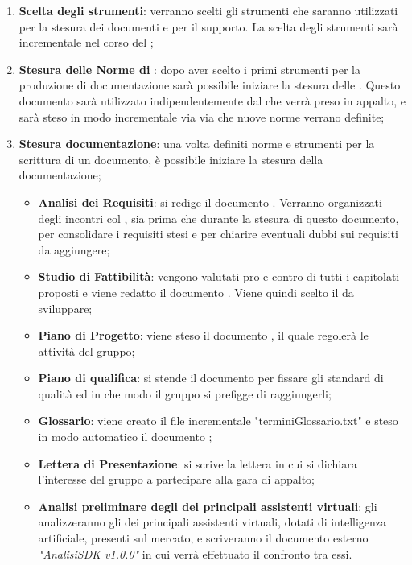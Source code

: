 \documentclass[./PianoDiProgetto.tex]{subfiles}
\begin{document}
  \begin{enumerate}
		\item \textbf{Scelta degli strumenti}: verranno scelti gli strumenti che saranno utilizzati per la stesura dei documenti e per il supporto. La scelta degli strumenti sarà incrementale nel corso del ;
		\item \textbf{Stesura delle Norme di }: dopo aver scelto i primi strumenti per la produzione di documentazione sarà possibile iniziare la stesura delle \NPdocRR. Questo documento sarà utilizzato indipendentemente dal  che verrà preso in appalto, e sarà steso in modo incrementale via via che nuove norme verrano definite;
		\item \textbf{Stesura documentazione}: una volta definiti norme e strumenti per la scrittura di un documento, è possibile iniziare la stesura della documentazione;
    \begin{itemize}
      \item \textbf{Analisi dei Requisiti}: si redige il documento \ARdocRR. Verranno organizzati degli incontri col , sia prima che durante la stesura di questo documento, per consolidare i requisiti stesi e per chiarire eventuali dubbi sui requisiti da aggiungere;
      \item \textbf{Studio di Fattibilità}: vengono valutati pro e contro di tutti i capitolati proposti e viene redatto il documento \SFdocRR. Viene quindi scelto il  da sviluppare;
      \item \textbf{Piano di Progetto}: viene steso il documento \PPdocRR, il quale regolerà le attività del gruppo;
      \item \textbf{Piano di qualifica}: si stende il documento \PQdocRR per fissare gli standard di qualità ed in che modo il gruppo si prefigge di raggiungerli;
      \item \textbf{Glossario}: viene creato il file incrementale "terminiGlossario.txt" e steso in modo automatico il documento \GldocRR;
      \item \textbf{Lettera di Presentazione}: si scrive la lettera in cui si dichiara l'interesse del gruppo a partecipare alla gara di appalto;
      \item \textbf{Analisi preliminare degli  dei principali assistenti virtuali}: gli \ANP{} analizzeranno gli  dei principali assistenti virtuali, dotati di intelligenza artificiale, presenti sul mercato, e scriveranno il documento esterno \textit{"AnalisiSDK v1.0.0"} in cui verrà effettuato il confronto tra  essi.
    \end{itemize}
  \end{enumerate}
\end{document}
